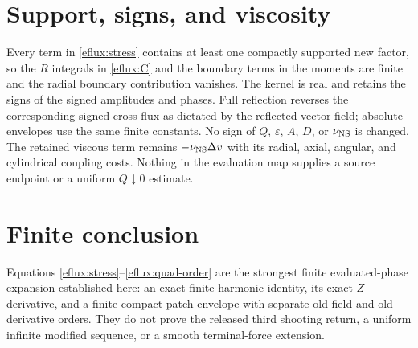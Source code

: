 \documentclass[11pt]{article}
\begin{document}
\section{Support, signs, and viscosity}
Every term in \eqref{eflux:stress} contains at least one compactly supported
new factor, so the $R$ integrals in \eqref{eflux:C} and the boundary terms in
the moments are finite and the radial boundary contribution vanishes.  The
kernel is real and retains the signs of the signed amplitudes and phases.
Full reflection reverses the corresponding signed cross flux as dictated by
the reflected vector field; absolute envelopes use the same finite constants.
No sign of $Q$, $\varepsilon$, $A$, $D$, or $\nu_{\rm NS}$ is changed.
The retained viscous term remains $-\nu_{\rm NS}\Delta v$ with its radial,
axial, angular, and cylindrical coupling costs.  Nothing in the evaluation
map supplies a source endpoint or a uniform $Q\downarrow0$ estimate.

\section{Finite conclusion}
Equations \eqref{eflux:stress}--\eqref{eflux:quad-order} are the strongest
finite evaluated-phase expansion established here: an exact finite harmonic
identity, its exact $Z$ derivative, and a finite compact-patch envelope with
separate old field and old derivative orders.  They do not prove the released
third shooting return, a uniform infinite modified sequence, or a smooth
terminal-force extension.
\end{document}
